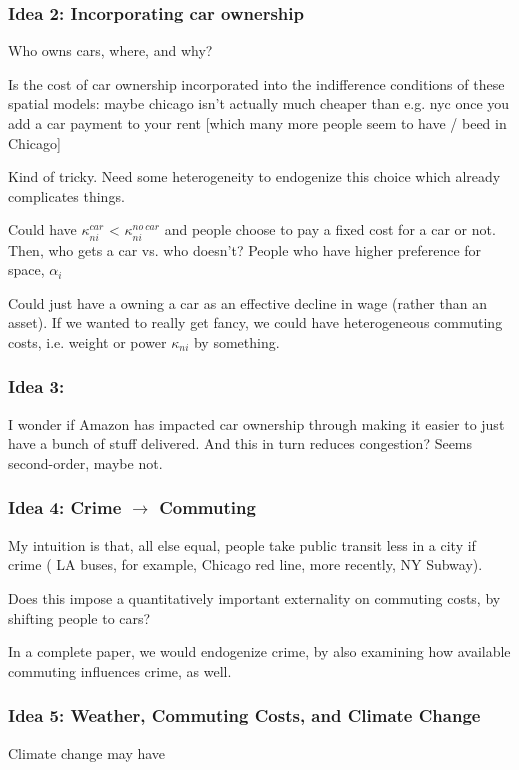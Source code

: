 \documentclass{article}
\begin{document}
\subsubsection{Idea 2: Incorporating car ownership}
Who owns cars, where, and why?

Is the cost of car ownership incorporated into the indifference conditions of these spatial models: maybe chicago isn't actually much cheaper than e.g. nyc once you add a car payment to your rent [which many more people seem to have / beed in Chicago] 


Kind of tricky. Need some heterogeneity to endogenize this choice which already complicates things.

Could have $\kappa^{car}_{ni}$ <
$\kappa^{no \ car}_{ni} $ and people choose to pay a fixed cost for a car or not. 
Then, who gets a car vs. who doesn't? 
People who have higher preference for space, $\alpha_i$

Could just have a owning a car as an effective decline in wage (rather than an asset).
If we wanted to really get fancy, we could have heterogeneous commuting costs, i.e. weight or power $\kappa_{ni}$ by something. 


\subsubsection{Idea 3: }
I wonder if Amazon has impacted car ownership through making it easier to just have a bunch of stuff delivered. 
And this in turn reduces congestion? Seems second-order, maybe not.

\subsubsection{Idea 4: Crime $\rightarrow$ Commuting}
My intuition is that, all else equal, people take public transit less in a city if crime ( LA buses, for example, Chicago red line, more recently, NY Subway).

Does this impose a quantitatively important externality on commuting costs, by shifting people to cars?

In a complete paper, we would endogenize crime, by also examining how available commuting influences crime, as well. 

\subsubsection{Idea 5: Weather, Commuting Costs, and Climate Change}
Climate change may have 
\end{document}
